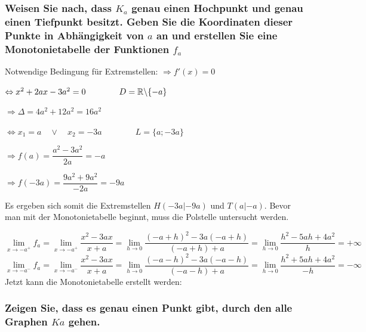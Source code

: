 \documentclass[main.tex]{subfiles}
\begin{document}
\subsubsection{Weisen Sie nach, dass $K_{a}$ genau einen Hochpunkt und genau einen Tiefpunkt besitzt. Geben Sie die Koordinaten dieser Punkte in Abhängigkeit von $a$ an und erstellen Sie eine Monotonietabelle der Funktionen $f_{a}$}

Notwendige Bedingung für Extremstellen: $\Rightarrow f'(x)=0$

$\Leftrightarrow x^2+2ax-3a^2 = 0 \qquad \qquad D= \mathbb{R} \backslash\{ -a \}$

$\Rightarrow \Delta = 4a^2 +12a^2 = 16a^2$

$\Leftrightarrow x_{1}=a \quad \lor \quad x_{2}=-3a \qquad \qquad L=\{a;-3a\}$

$\Rightarrow f(a)=\dfrac{a^2-3a^2}{2a} = -a$

$\Rightarrow f(-3a)= \dfrac{9a^2+9a^2}{-2a} = -9a$

Es ergeben sich somit die Extremstellen $H(-3a|-9a)$ und $T(a|-a)$. Bevor man mit der Monotonietabelle beginnt, muss die Polstelle untersucht werden.

$$\lim\limits_{x \rightarrow {-a^+}}{f_{a}} = \lim\limits_{x \rightarrow {-a^+}}{\dfrac{x^2-3ax}{x+a}} =\lim\limits_{h \rightarrow {0}}{\dfrac{(-a+h)^2 -3a(-a+h)}{(-a+h)+a}} = \lim\limits_{h \rightarrow {0}}{\dfrac{h^2-5ah+4a^2}{h}} = + \infty$$
$$\lim\limits_{x \rightarrow {-a^-}}{f_{a}} = \lim\limits_{x \rightarrow {-a^-}}{\dfrac{x^2-3ax}{x+a}} =\lim\limits_{h \rightarrow {0}}{\dfrac{(-a-h)^2 -3a(-a-h)}{(-a-h)+a}} = \lim\limits_{h \rightarrow {0}}{\dfrac{h^2+5ah+4a^2}{-h}} = - \infty$$
Jetzt kann die Monotonietabelle erstellt werden:


\subsubsection{Zeigen Sie, dass es genau einen Punkt gibt, durch den alle Graphen $Ka$ gehen.}
\end{document}
